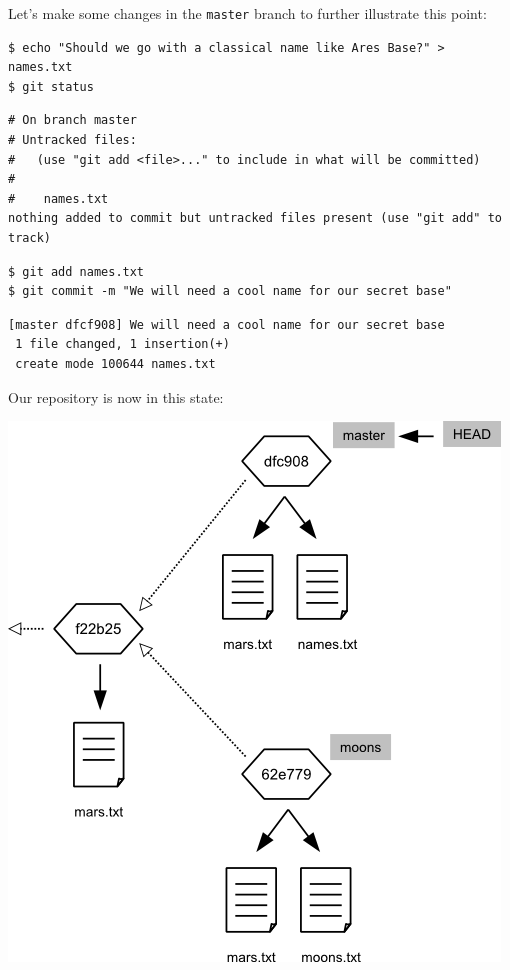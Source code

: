 \documentclass{book}
\begin{document}
Let's make some changes in the \texttt{master} branch to further
illustrate this point:

\begin{verbatim}
$ echo "Should we go with a classical name like Ares Base?" > names.txt
$ git status
\end{verbatim}

\begin{verbatim}
# On branch master
# Untracked files:
#   (use "git add <file>..." to include in what will be committed)
#
#    names.txt
nothing added to commit but untracked files present (use "git add" to track)
\end{verbatim}

\begin{verbatim}
$ git add names.txt
$ git commit -m "We will need a cool name for our secret base"
\end{verbatim}

\begin{verbatim}
[master dfcf908] We will need a cool name for our secret base
 1 file changed, 1 insertion(+)
 create mode 100644 names.txt
\end{verbatim}

Our repository is now in this state:

\includegraphics{novice/extras/img/git-branching-05.png}
\end{document}
